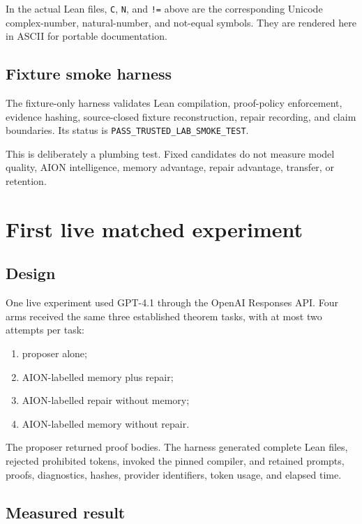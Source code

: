 \documentclass[11pt,a4paper]{article}
\newcommand{\code}[1]{\texttt{#1}}
\begin{document}
In the actual Lean files, \code{C}, \code{N}, and \code{!=} above are the
corresponding Unicode complex-number, natural-number, and not-equal symbols.
They are rendered here in ASCII for portable documentation.

\subsection{Fixture smoke harness}

The fixture-only harness validates Lean compilation, proof-policy enforcement,
evidence hashing, source-closed fixture reconstruction, repair recording, and
claim boundaries. Its status is \code{PASS\_TRUSTED\_LAB\_SMOKE\_TEST}.

This is deliberately a plumbing test. Fixed candidates do not measure model
quality, AION intelligence, memory advantage, repair advantage, transfer, or
retention.

\section{First live matched experiment}

\subsection{Design}

One live experiment used GPT-4.1 through the OpenAI Responses API. Four arms
received the same three established theorem tasks, with at most two attempts per
task:

\begin{enumerate}
  \item proposer alone;
  \item AION-labelled memory plus repair;
  \item AION-labelled repair without memory;
  \item AION-labelled memory without repair.
\end{enumerate}

The proposer returned proof bodies. The harness generated complete Lean files,
rejected prohibited tokens, invoked the pinned compiler, and retained prompts,
proofs, diagnostics, hashes, provider identifiers, token usage, and elapsed
time.

\subsection{Measured result}
\end{document}
